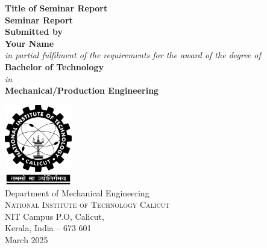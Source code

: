 \begin{titlepage}

\begin{center}



\Large \textbf {Title of Seminar Report}\\[0.3in]

\textup{\textbf{\bf Seminar Report}} \\[0.3in]
\textbf{\textbf{Submitted by} } \\[0.1in]
\textup{\textbf{Your Name}} \\[0.1in]
\small \textit{in partial fulfilment of the requirements for the award of the degree of} \\[0.25in]
\large \textbf{Bachelor of Technology}\\[0.1in]
\textit{in}\\[0.1in]
\large \textbf {Mechanical/Production Engineering}\\[0.1in]
\vspace{.1in}
  
\vfill

\includegraphics[width=1.16in]{nitc-logo}\\[0.1in]
\Large{Department of Mechanical Engineering}\\
\normalsize
\textsc{National Institute of Technology Calicut}\\
NIT Campus P.O, Calicut,\\
Kerala, India -- 673 601 \\
\vspace{0.3cm}
March 2025

\end{center}

\end{titlepage}
